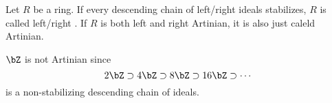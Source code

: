 \documentclass[10pt]{article}
\begin{document}
\begin{defn*}

    Let $R$ be a ring.
    If every descending chain of left/right ideals stabilizes, $R$ is called left/right .
    If $R$ is both left and right Artinian, it is also just caleld Artinian.

\end{defn*}

\begin{exam*}

    $\bZ$ is not Artinian since
    \[ 2\bZ \supset 4\bZ \supset 8\bZ \supset 16\bZ \supset \cdots \]
    is a non-stabilizing descending chain of ideals.

\end{exam*}
\end{document}
